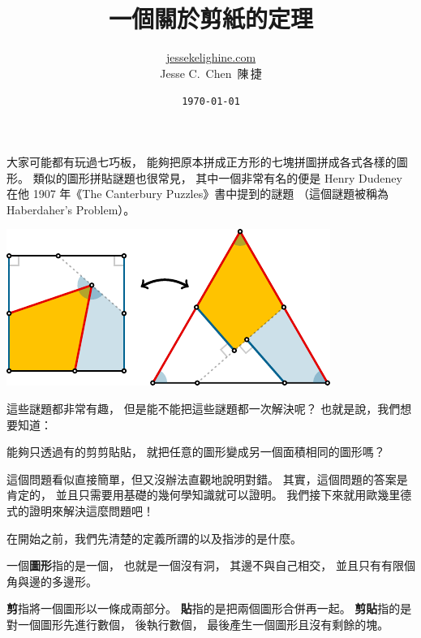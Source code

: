 \documentclass{article}
\title{一個關於剪紙的定理}
\author{\href{https://jessekelighine.com}{jessekelighine.com}\\Jesse C.\ Chen\ 陳\,捷}
\date{\texttt{\today}}
\begin{document}
\begin{multicols}{2}

\begin{spacing}{1}
	\maketitle\thispagestyle{fancy}
\end{spacing}

\noindent
大家可能都有玩過七巧板，
能夠把原本拼成正方形的七塊拼圖拼成各式各樣的圖形。
類似的圖形拼貼謎題也很常見，
其中一個非常有名的便是 Henry Dudeney 在他 1907 年《The Canterbury Puzzles》書中提到的謎題
（這個謎題被稱為 Haberdaher's Problem）。
\begin{center}
	\includegraphics[scale=1]{figures/figure-example.pdf}
\end{center}
這些謎題都非常有趣，
但是能不能把這些謎題都一次解決呢？
也就是說，我們想要知道：
\begin{question*}
	能夠只透過有的剪剪貼貼，
	就把任意的圖形變成另一個面積相同的圖形嗎？
\end{question*}
\noindent
這個問題看似直接簡單，但又沒辦法直觀地說明對錯。
其實，這個問題的答案是肯定的，
並且只需要用基礎的幾何學知識就可以證明。
我們接下來就用歐幾里德式的證明來解決這麼問題吧！

\dinkus

\noindent
在開始之前，我們先清楚的定義所謂的以及指涉的是什麼。

\begin{definition}[圖形]
	一個\textbf{圖形}指的是一個，
	也就是一個沒有洞，
	其邊不與自己相交，
	並且只有有限個角與邊的多邊形。
\end{definition}

\begin{definition}[剪貼]
	\textbf{剪}指將一個圖形以一條成兩部分。
	\textbf{貼}指的是把兩個圖形合併再一起。
	\textbf{剪貼}指的是對一個圖形先進行數個，
	後執行數個，
	最後產生一個圖形且沒有剩餘的塊。
\end{definition}


\end{multicols}
\end{document}
